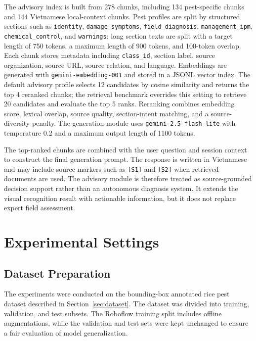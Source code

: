 ﻿\documentclass[11pt]{article}
\begin{document}
The advisory index is built from 278 chunks, including 134 pest-specific chunks and 144 Vietnamese local-context chunks. Pest profiles are split by structured sections such as \texttt{identity}, \texttt{damage\_symptoms}, \texttt{field\_diagnosis}, \texttt{management\_ipm}, \texttt{chemical\_control}, and \texttt{warnings}; long section texts are split with a target length of 750 tokens, a maximum length of 900 tokens, and 100-token overlap. Each chunk stores metadata including \texttt{class\_id}, section label, source organization, source URL, source relation, and language. Embeddings are generated with \texttt{gemini-embedding-001} and stored in a JSONL vector index. The default advisory profile selects 12 candidates by cosine similarity and returns the top 4 reranked chunks; the retrieval benchmark overrides this setting to retrieve 20 candidates and evaluate the top 5 ranks. Reranking combines embedding score, lexical overlap, source quality, section-intent matching, and a source-diversity penalty. The generation module uses \texttt{gemini-2.5-flash-lite} with temperature 0.2 and a maximum output length of 1100 tokens.

The top-ranked chunks are combined with the user question and session context to construct the final generation prompt. The response is written in Vietnamese and may include source markers such as \texttt{[S1]} and \texttt{[S2]} when retrieved documents are used. The advisory module is therefore treated as source-grounded decision support rather than an autonomous diagnosis system. It extends the visual recognition result with actionable information, but it does not replace expert field assessment.



\section{Experimental Settings}

\subsection{Dataset Preparation}

The experiments were conducted on the bounding-box annotated rice pest dataset described in Section~\ref{sec:dataset}. The dataset was divided into training, validation, and test subsets. The Roboflow training split includes offline augmentations, while the validation and test sets were kept unchanged to ensure a fair evaluation of model generalization.
\end{document}
